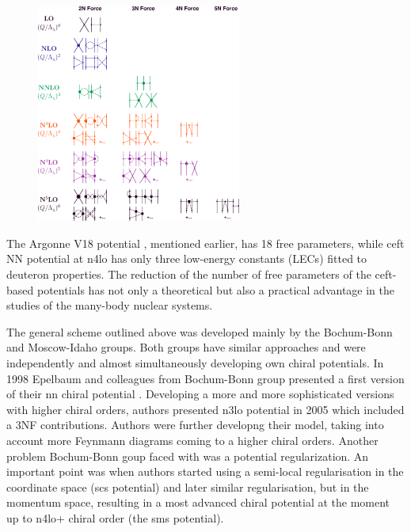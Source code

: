 \begin{figure}[h]
    \begin{center}
    \includegraphics[width=0.6\textwidth]{Figures/chiral.png}
    \end{center}
    \caption{}
    \label{proton_rad}
\end{figure}

The Argonne V18 potential \cite{AV18Wiringa}, mentioned earlier, has 18 free parameters,
while \gls{ceft} NN potential at \gls{n4lo} \cite{Machleidt2011} has only three low-energy constants (LECs) fitted to deuteron properties.
The reduction of the number of free parameters of the \gls{ceft}-based potentials
has not only a theoretical but also a practical advantage in the studies of the many-body nuclear systems.

The general scheme outlined above was developed mainly by the Bochum-Bonn and Moscow-Idaho groups.
Both groups have similar approaches and were independently and almost simultaneously
developing own chiral potentials. In 1998 Epelbaum and colleagues from Bochum-Bonn group 
presented a first version of their \gls{nn} chiral potential \cite{EPELBAOUM1998107, epelbaum2000two}.
Developing a more and more sophisticated versions with higher chiral orders, authors presented
\gls{n3lo} potential in 2005 \cite{epelbaum2005two} which included a 3NF contributions.
Authors were further developng their model, taking into account more Feynmann diagrams
coming to a higher chiral orders. Another problem Bochum-Bonn goup faced with was a potential regularization. An important point was when authors started using a semi-local regularisation 
in the coordinate space (\gls{scs} potential) \cite{Epelbaum2014SCS} and later similar regularisation, but in the momentum space, resulting in a most advanced chiral potential at the moment up to  
\gls{n4lo+} chiral order \cite{reinkrebs2018} (the \gls{sms} potential).

